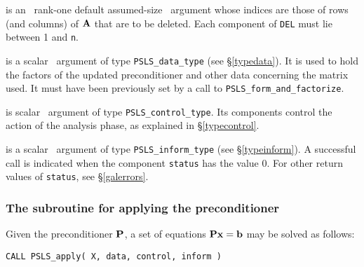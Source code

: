 \documentclass{galahad}
\newcommand{\packagename}{PSLS}
\begin{document}
\begin{description}
 is an \intentin\ rank-one default assumed-size 
\integer\ argument whose indices are those of rows (and columns) of ${\mathbf{A}}$
that are to be deleted. Each component of {\tt DEL} must lie between 1 and 
{\tt n}.

 is a scalar \intentinout\ argument of type
{\tt \packagename\_data\_type}
(see \S\ref{typedata}). It is used to hold the factors of the 
updated preconditioner and other data concerning the matrix used.
It must have been previously set by a call to
{\tt \packagename\_form\_and\_factorize}.

 is scalar \intentin\ argument of type
{\tt \packagename\_control\_type}. Its components control the action
of the analysis phase, as explained in
\S\ref{typecontrol}.

 is a scalar \intentinout\ argument of type
{\tt \packagename\_inform\_type}
(see \S\ref{typeinform}).
A successful call is indicated when the  component {\tt status} has the value 0.
For other return values of {\tt status}, see \S\ref{galerrors}.

\end{description}


\subsubsection{The subroutine for applying the preconditioner}
\label{solve}
Given the preconditioner ${\mathbf{P}}$, a set of equations 
${\mathbf{P}} {\mathbf{x}} = {\mathbf{b}}$ may be solved as follows:

\hskip0.5in
{\tt CALL \packagename\_apply( X, data, control, inform )}
\end{document}
